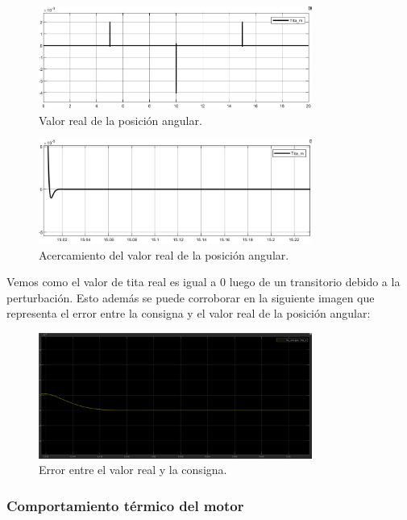 \documentclass{article}
\begin{document}
\begin{figure}[H]
    \centering
    \includegraphics[width=0.8\textwidth]{5.2.5.1.b.1.png}
    \caption{Valor real de la posición angular.}
\end{figure}

\begin{figure}[H]
    \centering
    \includegraphics[width=0.8\textwidth]{5.2.5.1.b.3.png}
    \caption{Acercamiento del valor real de la posición angular.}
\end{figure}

Vemos como el valor de tita real es igual a 0 luego de un transitorio debido a la perturbación. 
Esto además se puede corroborar en la siguiente imagen que representa el error entre la consigna y 
el valor real de la posición angular:

\begin{figure}[H]
    \centering
    \includegraphics[width=0.8\textwidth]{5.2.5.1.b.2.png}
    \caption{Error entre el valor real y la consigna.}
\end{figure}


\subsubsection{Comportamiento térmico del motor}
\end{document}

